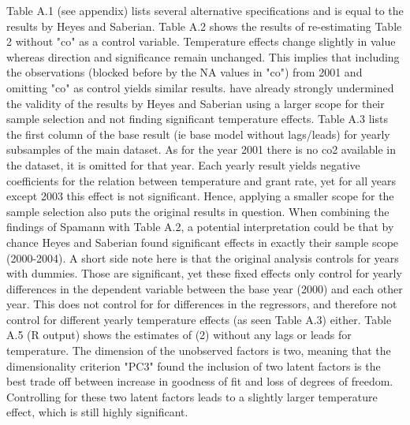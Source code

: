 \documentclass[11pt]{article}
\begin{document}
	Table A.1 (see appendix) lists several alternative specifications and is equal to the results by Heyes and Saberian.
	Table A.2 shows the results of re-estimating Table 2 without "co" as a control variable. Temperature effects change slightly in value whereas direction and significance remain unchanged. This implies that including the observations (blocked before by the NA values in "co") from 2001 and omitting "co" as control yields similar results.
	\newline \cite{Spamann.2020} have already strongly undermined the validity of the results by Heyes and Saberian using a larger scope for their sample selection and not finding significant temperature effects. Table A.3 lists the first column of the base result (ie base model without lags/leads) for yearly subsamples of the main dataset. As for the year 2001 there is no co2 available in the dataset, it is omitted for that year. Each yearly result yields negative coefficients for the relation between temperature and grant rate, yet for all years except 2003 this effect is not significant. Hence, applying a smaller scope for the sample selection also puts the original results in question. When combining the findings of Spamann with Table A.2, a potential interpretation could be that by chance Heyes and Saberian found significant effects in exactly their sample scope (2000-2004). A short side note here is that the original analysis controls for years with dummies. Those are significant, yet these fixed effects only control for yearly differences in the dependent variable between the base year (2000) and each other year. This does not control for for differences in the regressors, and therefore not control for different yearly temperature effects (as seen Table A.3) either.
	Table A.5 (R output) shows the estimates of (2) without any lags or leads for temperature. The dimension of the unobserved factors is two, meaning that the dimensionality criterion "PC3" found the inclusion of two latent factors is the best trade off between increase in goodness of fit and loss of degrees of freedom. Controlling for these two latent factors leads to a slightly larger temperature effect, which is still highly significant.
\end{document}
